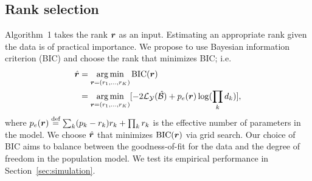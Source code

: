 \documentclass{article}
\theoremstyle{plain}
\theoremstyle{definition}
\begin{document}
\subsection{Rank selection}\label{sec:tuning}
Algorithm~1 takes the rank $\bm{r}$ as an input. Estimating an appropriate rank given the data is of practical importance. We propose to use Bayesian information criterion (BIC) and choose the rank that minimizes BIC; i.e.
\begin{align}\label{eq:BIC}
\hat {\bm{r}}&=\operatorname*{arg\,min}_{\bm{r}=(r_1,\ldots,r_K)} \text{BIC}(\bm{r})\\
&=\operatorname*{arg\,min}_{\bm{r}=(r_1,\ldots,r_K)}[-2\mathcal{L}_{\mathcal{Y}}(\hat {\mathcal{B}})+p_e(\bm{r})\log (\prod_k d_k)],
\end{align}
where $p_e(\bm{r})\stackrel{\text{def}}{=}\sum_k (p_k-r_k)r_k+\prod_k r_k$ is the effective number of parameters in the model. We choose $\hat {\bm{r}}$ that minimizes $\text{BIC}(\bm{r})$ via grid search. Our choice of BIC aims to balance between the goodness-of-fit for the data and the degree of freedom in the population model. We test its empirical performance in Section~\ref{sec:simulation}.  
\vspace{-.2cm}
\end{document}
